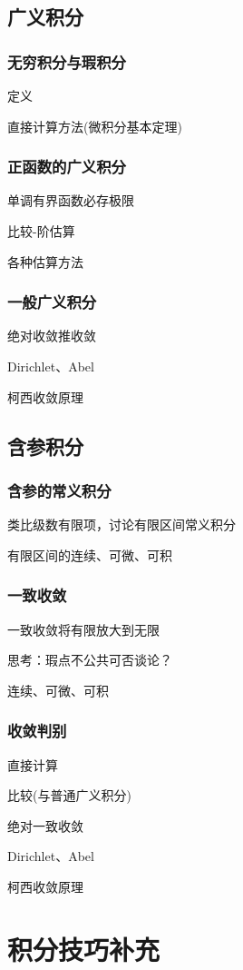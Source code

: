 \documentclass[a4paper,UTF8,fontset=windows,AutoFakeBold]{ctexart}
\theoremstyle{ex}
\begin{document}
\subsection{广义积分}
\subsubsection{无穷积分与瑕积分}
定义

直接计算方法(微积分基本定理)

\subsubsection{正函数的广义积分}
单调有界函数必存极限

比较-阶估算

各种估算方法

\subsubsection{一般广义积分}
绝对收敛推收敛

Dirichlet、Abel

柯西收敛原理

\subsection{含参积分}
\subsubsection{含参的常义积分}
类比级数有限项，讨论有限区间常义积分

有限区间的连续、可微、可积

\subsubsection{一致收敛}
一致收敛将有限放大到无限

思考：瑕点不公共可否谈论？

连续、可微、可积

\subsubsection{收敛判别}
直接计算

比较(与普通广义积分)

绝对一致收敛

Dirichlet、Abel

柯西收敛原理

\newpage
\section{积分技巧补充}
\end{document}
